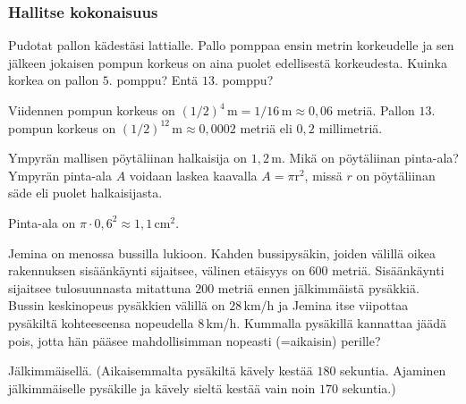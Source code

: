 \begin{tehtavasivu}
\subsubsection*{Hallitse kokonaisuus}

\begin{tehtava}
Pudotat pallon kädestäsi lattialle. Pallo pomppaa ensin metrin korkeudelle ja sen jälkeen jokaisen pompun korkeus on aina puolet edellisestä korkeudesta. Kuinka korkea on pallon $5$. pomppu? Entä $13$. pomppu?     
        \begin{vastaus}
Viidennen pompun korkeus on $(1/2)^4\,\textrm{m}=1/16\,\textrm{m}\approx 0,06$ metriä. Pallon $13$. pompun korkeus on $(1/2)^{12}\,\textrm{m} \approx 0,0002$ metriä eli $0,2$ millimetriä.
        \end{vastaus}
\end{tehtava}

\begin{tehtava}
Ympyrän mallisen pöytäliinan halkaisija on $1,2$\,m. Mikä on pöytäliinan pinta-ala? Ympyrän pinta-ala $A$ voidaan laskea kaavalla $A=\pi\text{r}^2$, missä $r$ on pöytäliinan säde eli puolet halkaisijasta.
        \begin{vastaus}
        Pinta-ala on $\pi \cdot 0,6^2 \approx 1,1\,$cm$^2$.
        \end{vastaus}
\end{tehtava}

\begin{tehtava} %
Jemina on menossa bussilla lukioon. Kahden bussipysäkin, joiden välillä oikea rakennuksen sisäänkäynti sijaitsee, välinen etäisyys on $600$ metriä. Sisäänkäynti sijaitsee tulosuunnasta mitattuna $200$ metriä ennen jälkimmäistä pysäkkiä. Bussin keskinopeus pysäkkien välillä on $28$\,km/h ja Jemina itse viipottaa pysäkiltä kohteeseensa nopeudella $8$\,km/h. Kummalla pysäkillä kannattaa jäädä pois, jotta hän pääsee mahdollisimman nopeasti (=aikaisin) perille?
	\begin{vastaus}
	Jälkimmäisellä. (Aikaisemmalta pysäkiltä kävely kestää $180$ sekuntia. Ajaminen jälkimmäiselle pysäkille ja kävely sieltä kestää vain noin $170$ sekuntia.) 
	\end{vastaus}
\end{tehtava}


\end{tehtavasivu}
